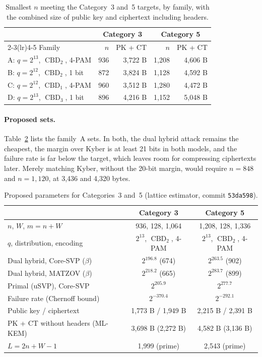 \documentclass[11pt,a4paper]{article}
\theoremstyle{definition}
\newcommand{\CBD}{\operatorname{CBD}}
\begin{document}
\begin{table}[H]
\centering
\small
\begin{tabular}{lrrrr}
\toprule
& \multicolumn{2}{c}{Category 3} & \multicolumn{2}{c}{Category 5} \\
\cmidrule(lr){2-3}\cmidrule(lr){4-5}
Family & $n$ & PK + CT & $n$ & PK + CT \\
\midrule
A: $q = 2^{13}$, $\CBD_2$, 4-PAM & 936 & 3{,}722 B & 1{,}208 & 4{,}606 B \\
B: $q = 2^{12}$, $\CBD_2$, 1 bit & 872 & 3{,}824 B & 1{,}128 & 4{,}592 B \\
C: $q = 2^{12}$, $\CBD_1$, 4-PAM & 960 & 3{,}512 B & 1{,}280 & 4{,}472 B \\
D: $q = 2^{13}$, $\CBD_3$, 1 bit & 896 & 4{,}216 B & 1{,}152 & 5{,}048 B \\
\bottomrule
\end{tabular}
\caption{Smallest $n$ meeting the Category~3 and~5 targets, by family, with the combined size of public key and ciphertext including headers.}
\label{tab:families}
\end{table}

\paragraph{Proposed sets.} Table~\ref{tab:higher} lists the family~A sets. In both, the dual hybrid attack remains the cheapest, the margin over Kyber is at least 21 bits in both models, and the failure rate is far below the target, which leaves room for compressing ciphertexts later. Merely matching Kyber, without the 20-bit margin, would require $n = 848$ and $n = 1{,}120$, at 3{,}436 and 4{,}320 bytes.

\begin{table}[H]
\centering
\small
\begin{tabular}{lcc}
\toprule
& Category 3 & Category 5 \\
\midrule
$n$, $W$, $m = n + W$ & 936, 128, 1{,}064 & 1{,}208, 128, 1{,}336 \\
$q$, distribution, encoding & $2^{13}$, $\CBD_2$, 4-PAM & $2^{13}$, $\CBD_2$, 4-PAM \\
Dual hybrid, Core-SVP ($\beta$) & $2^{196.8}$ (674) & $2^{263.5}$ (902) \\
Dual hybrid, MATZOV ($\beta$) & $2^{218.2}$ (665) & $2^{283.7}$ (899) \\
Primal (uSVP), Core-SVP & $2^{205.9}$ & $2^{277.7}$ \\
Failure rate (Chernoff bound) & $2^{-370.4}$ & $2^{-292.1}$ \\
Public key / ciphertext & 1{,}773 B / 1{,}949 B & 2{,}215 B / 2{,}391 B \\
PK + CT without headers (ML-KEM) & 3{,}698 B (2{,}272 B) & 4{,}582 B (3{,}136 B) \\
$L = 2n + W - 1$ & 1{,}999 (prime) & 2{,}543 (prime) \\
\bottomrule
\end{tabular}
\caption{Proposed parameters for Categories~3 and~5 (lattice estimator, commit \texttt{53da598}).}
\label{tab:higher}
\end{table}
\end{document}
